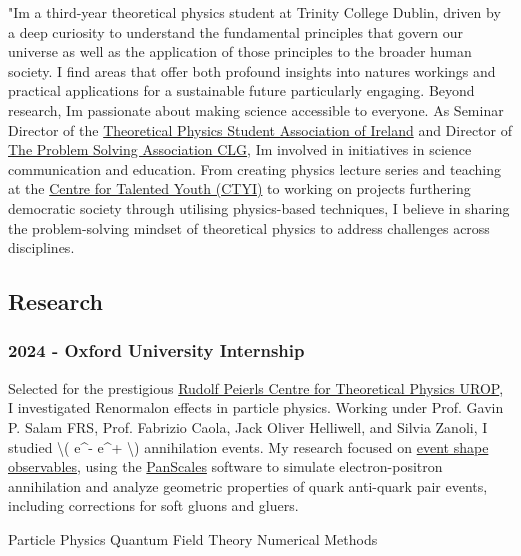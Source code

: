 \documentclass{article}
\begin{document}
"I\textquotesingle m a third-year theoretical physics student at Trinity
College Dublin, driven by a deep curiosity to understand the fundamental
principles that govern our universe as well as the application of those
principles to the broader human society. I find areas that offer both
profound insights into nature\textquotesingle s workings and practical
applications for a sustainable future particularly engaging. Beyond
research, I\textquotesingle m passionate about making science accessible
to everyone. As Seminar Director of the
\href{https://www.tpsa.ie/homepage}{Theoretical Physics Student
Association of Ireland} and Director of
\href{https://tpsa.ie/problemsolving}{The Problem Solving Association
CLG}, I\textquotesingle m involved in initiatives in science
communication and education. From creating physics lecture series and
teaching at the \href{https://www.dcu.ie/ctyi}{Centre for Talented Youth
(CTYI)} to working on projects furthering democratic society through
utilising physics-based techniques, I believe in sharing the
problem-solving mindset of theoretical physics to address challenges
across disciplines.

\subsection{Research}\label{research}

\subsubsection{2024 - Oxford University
Internship}\label{oxford-university-internship}

Selected for the prestigious
\href{https://www.physics.ox.ac.uk/research/subdepartment/rudolf-peierls-centre-theoretical-physics/undergraduate-research}{Rudolf
Peierls Centre for Theoretical Physics UROP}, I investigated Renormalon
effects in particle physics. Working under Prof. Gavin P. Salam FRS,
Prof. Fabrizio Caola, Jack Oliver Helliwell, and Silvia Zanoli, I
studied \textbackslash( e\^{}- e\^{}+ \textbackslash) annihilation
events. My research focused on
\href{https://arxiv.org/abs/hep-ph/0312283}{event shape observables},
using the \href{https://gitlab.com/panscales/panscales-0.X}{PanScales}
software to simulate electron-positron annihilation and analyze
geometric properties of quark anti-quark pair events, including
corrections for soft gluons and gluers.

{Particle Physics} {Quantum Field Theory} {Numerical Methods}
\end{document}
